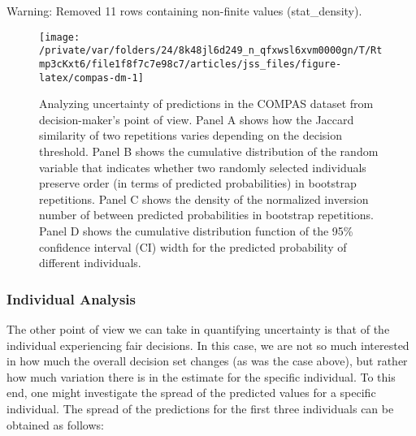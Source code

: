 \documentclass[
  nojss]{jss}
\begin{document}
\begin{CodeChunk}
\begin{CodeOutput}
Warning: Removed 11 rows containing non-finite values (stat_density).
\end{CodeOutput}
\begin{figure}

{\centering \texttt{[image: /private/var/folders/24/8k48jl6d249\_n\_qfxwsl6xvm0000gn/T/Rtmp3cKxt6/file1f8f7c7e98c7/articles/jss\_files/figure-latex/compas-dm-1]} 

}

\caption[Analyzing uncertainty of predictions in the COMPAS dataset from decision-maker's point of view]{Analyzing uncertainty of predictions in the COMPAS dataset from decision-maker's point of view. Panel A shows how the Jaccard similarity of two repetitions varies depending on the decision threshold. Panel B shows the cumulative distribution of the random variable that indicates whether two randomly selected individuals preserve order (in terms of predicted probabilities) in bootstrap repetitions. Panel C shows the density of the normalized inversion number of between predicted probabilities in bootstrap repetitions. Panel D shows the cumulative distribution function of the 95\% confidence interval (CI) width for the predicted probability of different individuals.}\label{fig:compas-dm}
\end{figure}
\end{CodeChunk}

\hypertarget{individual-analysis}{%
\subsubsection{Individual Analysis}\label{individual-analysis}}

The other point of view we can take in quantifying uncertainty is that
of the individual experiencing fair decisions. In this case, we are not
so much interested in how much the overall decision set changes (as was
the case above), but rather how much variation there is in the estimate
for the specific individual. To this end, one might investigate the
spread of the predicted values for a specific individual. The spread of
the predictions for the first three individuals can be obtained as
follows:

\begin{CodeChunk}
\end{CodeChunk}
\end{document}

